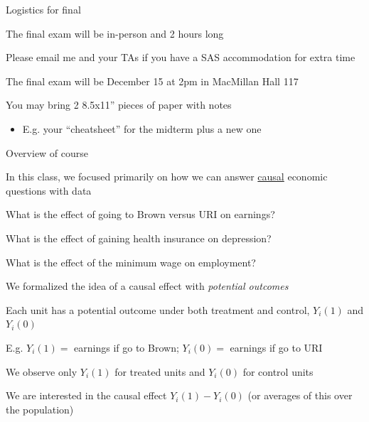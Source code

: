 \documentclass[11pt,english,handout]{beamer}
\newenvironment{wideitemize}{\itemize\addtolength{\itemsep}{10pt}}{\enditemize}
\begin{document}
\begin{frame}{Logistics for final}
	\begin{wideitemize}
		
		\item
		The final exam will be in-person and 2 hours long
			\begin{wideitemize}
				\item
				Please email me and your TAs if you have a SAS accommodation for extra time
				
			\end{wideitemize}
		
		\item
		The final exam will be December 15 at 2pm in MacMillan Hall 117
		
		\item
		You may bring 2 8.5x11'' pieces of paper with notes
			\begin{itemize}
				\item 
				E.g. your ``cheatsheet'' for the midterm plus a new one
			\end{itemize}
		
	\end{wideitemize}
\end{frame}

\begin{frame}{Overview of course}
	\begin{wideitemize}
		\item
		In this class, we focused primarily on how we can answer \underline{causal} economic questions with data
			\begin{wideitemize}
				\item
				What is the effect of going to Brown versus URI on earnings? 
				
				\item
				What is the effect of gaining health insurance on depression? 
				
				\item
				What is the effect of the minimum wage on employment?
			\end{wideitemize}
		
		\pause
		\item
		We formalized the idea of a causal effect with \textit{potential outcomes}
			\begin{wideitemize}
				\item 
				Each unit has a potential outcome under both treatment and control, $Y_i(1)$ and $Y_i(0)$
				
				\item
				E.g. $Y_i(1) =$ earnings if go to Brown; $Y_i(0)=$ earnings if go to URI
				
				\item
				We observe only $Y_i(1)$ for treated units and $Y_i(0)$ for control units
				
				\item
				We are interested in the causal effect $Y_i(1) - Y_i(0)$ (or averages of this over the population) 
			\end{wideitemize}
	\end{wideitemize}
\end{frame}
\end{document}
